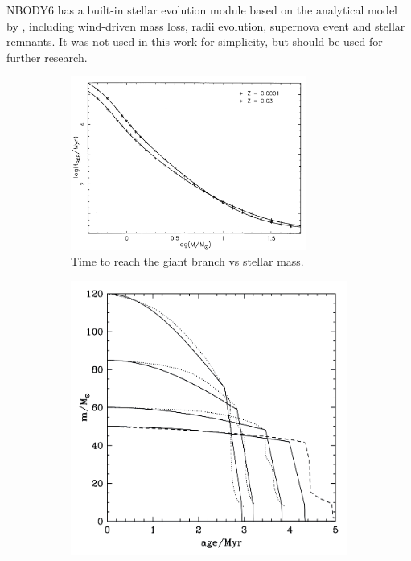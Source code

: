NBODY6 has a built-in stellar evolution module based on the analytical model by \cite{Hurley2000}, including wind-driven mass loss, radii evolution, supernova event and stellar remnants. It was not used in this work for simplicity, but should be used for further research.



\begin{figure}
    \centering
    \begin{subfigure}[b]{0.60\textwidth}
        \centering
        \includegraphics[width=0.85\textwidth]{Figures/7_stellarlifetime.png}
        \caption{Time to reach the giant branch vs stellar mass.}
        \label{Fig:7_stellarlifetime_hurley}
    \end{subfigure}
    \begin{subfigure}[b]{0.38\textwidth}
        \centering
        \includegraphics[width=\textwidth]{Figures/7_stellarlifetime_weidner.png}

\end{subfigure}
\end{figure}
